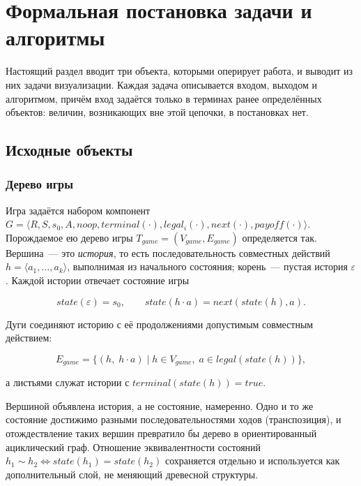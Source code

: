 \section{Формальная постановка задачи и алгоритмы}

Настоящий раздел вводит три объекта, которыми оперирует работа, и выводит
из них задачи визуализации. Каждая задача описывается входом, выходом и
алгоритмом, причём вход задаётся только в терминах ранее определённых
объектов: величин, возникающих вне этой цепочки, в постановках нет.

\subsection{Исходные объекты}

\subsubsection{Дерево игры}

Игра задаётся набором компонент $G = \langle R, S, s_0, A, noop,
terminal(\cdot), legal_i(\cdot), next(\cdot), payoff(\cdot) \rangle$.
Порождаемое ею дерево игры $T_{game} = (V_{game}, E_{game})$ определяется
так. Вершина~--- это \emph{история}, то есть последовательность совместных
действий $h = \langle a_1, \dots, a_k \rangle$, выполнимая из начального
состояния; корень~--- пустая история $\varepsilon$. Каждой истории отвечает
состояние игры

\begin{equation}
state(\varepsilon) = s_0, \qquad
state(h \cdot a) = next(state(h), a).
\end{equation}

Дуги соединяют историю с её продолжениями допустимым совместным действием:

\begin{equation}
E_{game} = \bigl\{ (h,\; h \cdot a) \;\big|\; h \in V_{game},\;
a \in legal(state(h)) \bigr\},
\end{equation}

а листьями служат истории с $terminal(state(h)) = \mathit{true}$.

Вершиной объявлена история, а не состояние, намеренно. Одно и то же
состояние достижимо разными последовательностями ходов (транспозиция), и
отождествление таких вершин превратило бы дерево в ориентированный
ациклический граф. Отношение эквивалентности состояний
$h_1 \sim h_2 \Leftrightarrow state(h_1) = state(h_2)$ сохраняется отдельно
и используется как дополнительный слой, не меняющий древесной структуры.

